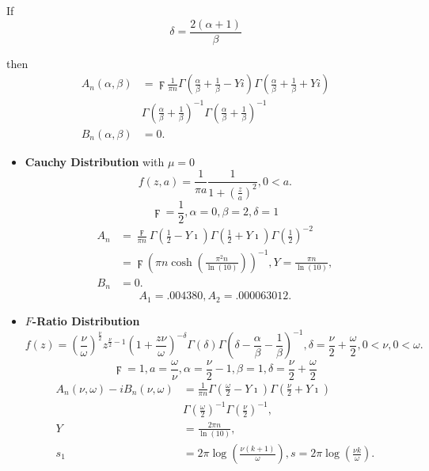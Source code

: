 \documentclass[titlepage,fleqn]{article}%
\begin{document}
If
\[
\delta=\frac{2(\alpha+1)}{\beta}%
\]


\noindent then
\begin{align*}
A_{n}(\alpha,\beta)  &  =\digamma\frac{1}{\pi n}\Gamma\left(  \frac{\alpha
}{\beta}+\frac{1}{\beta}-Yi\right)  \Gamma\left(  \frac{\alpha}{\beta}%
+\frac{1}{\beta}+Yi\right) \\
&  \Gamma\left(  \frac{\alpha}{\beta}+\frac{1}{\beta}\right)  ^{-1}%
\Gamma\left(  \frac{\alpha}{\beta}+\frac{1}{\beta}\right)  ^{-1}\\
B_{n}(\alpha,\beta)  &  =0.
\end{align*}


\begin{itemize}
\item \textbf{Cauchy Distribution} with $\mu=0$%
\[
f(z,a)=\frac{1}{\pi a}\frac{1}{1+\left(  \frac{z}{a}\right)  ^{2}},0<a.
\]%
\[
\digamma=\frac{1}{2},\alpha=0,\beta=2,\delta=1
\]%
\begin{align*}
A_{n}  &  =\frac{\digamma}{\pi n}\Gamma\left(  \frac{1}{2}-Y\imath\right)
\Gamma\left(  \frac{1}{2}+Y\imath\right)  \Gamma\left(  \frac{1}{2}\right)
^{-2}\\
&  =\digamma\left(  \pi n\cosh\left(  \frac{\pi^{2}n}{\ln(10)}\right)
\right)  ^{-1},Y=\frac{\pi n}{\ln(10)},\\
B_{n}  &  =0.
\end{align*}%
\begin{equation}
A_{1}=.004380,A_{2}=.000063012.
\end{equation}
\bigskip

\item \textbf{$F$-Ratio Distribution}%
\[
f(z)=\left(  \frac{\nu}{\omega}\right)  ^{\frac{\nu}{2}}z^{\frac{\nu}{2}%
-1}\left(  1+\frac{z\nu}{\omega}\right)  ^{-\delta}\Gamma\left(
\delta\right)  \Gamma\left(  \delta-\frac{\alpha}{\beta}-\frac{1}{\beta
}\right)  ^{-1},\delta=\frac{\nu}{2}+\frac{\omega}{2},0<\nu,0<\omega.
\]%
\[
\digamma=1,a=\frac{\omega}{\nu},\alpha=\frac{\nu}{2}-1,\beta=1,\delta
=\frac{\nu}{2}+\frac{\omega}{2}%
\]%
\begin{align}
A_{n}(\nu,\omega)-iB_{n}(\nu,\omega)  &  =\frac{1}{\pi n}\Gamma\left(
\frac{\omega}{2}-Y\imath\right)  \Gamma\left(  \frac{\nu}{2}+Y\imath\right) \\
&  \Gamma\left(  \frac{\omega}{2}\right)  ^{-1}\Gamma\left(  \frac{\nu}%
{2}\right)  ^{-1},\nonumber\\
Y  &  =\frac{2\pi n}{\ln(10)},\nonumber\\
s_{1}  &  =2\pi\log\left(  \frac{\nu(k+1)}{\omega}\right)  ,s=2\pi\log\left(
\frac{\nu k}{\omega}\right)  .\nonumber
\end{align}



\end{itemize}
\end{document}

